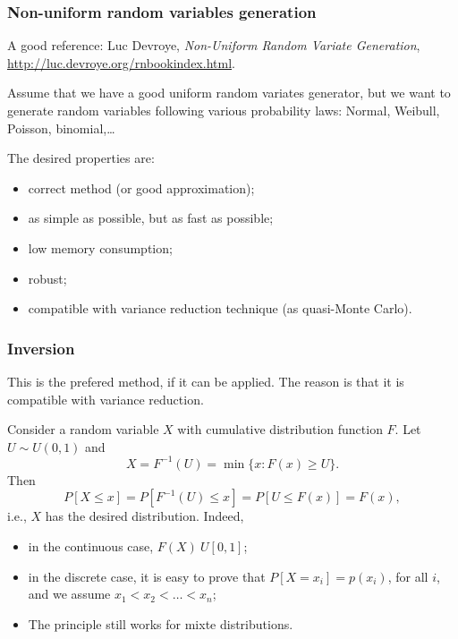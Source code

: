 \documentclass{beamer}
\begin{document}
	\begin{frame}
		\frametitle{Non-uniform random variables generation}
		\label{chap:nonuniform}
		
		A good reference: Luc Devroye, \textsl{Non-Uniform
			Random Variate Generation},
		\url{http://luc.devroye.org/rnbookindex.html}.
		
		\mbox{}
		
		Assume that we have a good uniform random variates generator, but we
		want to generate random variables following various probability laws:
		Normal, Weibull, Poisson, binomial,\ldots
		
		\mbox{}
		
		The desired properties are:
		\begin{itemize}
			\item
			correct method (or good approximation);
			\item
			as simple as possible, but as fast as possible;
			\item
			low memory consumption;
			\item
			robust;
			\item
			compatible with variance reduction technique (as quasi-Monte Carlo).
		\end{itemize}
		
	\end{frame}
	
	\begin{frame}
		\frametitle{Inversion}
		
		This is the prefered method, if it can be applied. The reason is that
		it is compatible with variance reduction.
		
		\mbox{}
		
		Consider a random variable $X$ with cumulative distribution function $F$.
		Let $U \sim U (0, 1)$ and
		\[
		X = F^{-1}(U) = \min \lbrace x : F (x)  \geq U \rbrace.
		\]
		Then
		\[
		P [X \leq x] = P [F^{-1}(U) \leq x] = P [U \leq F (x)] = F (x),
		\]
		i.e., $X$ has the desired distribution.
		Indeed,
		\begin{itemize}
			\item
			in the continuous case, $F(X) ~ U[0,1]$;
			\item
			in the discrete case, it is easy to prove that $P[X = x_i] = p(x_i)$,
			for all $i$, and we assume $x_1 < x_2 < \ldots < x_n$;
			\item
			The principle still works for mixte distributions.
		\end{itemize}
		
	\end{frame}
	
\end{document}
